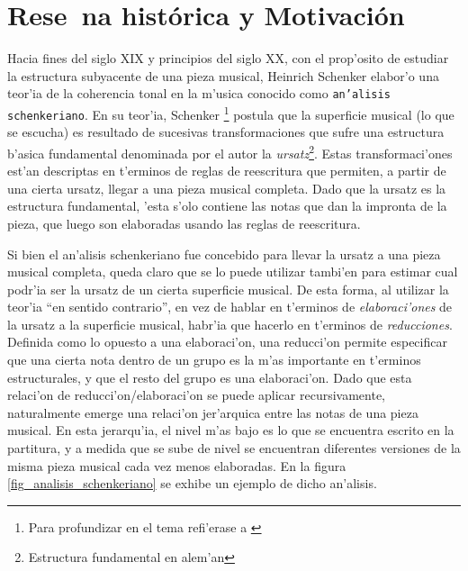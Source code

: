 \section{Rese~na hist\'orica y Motivaci\'on}
Hacia fines del siglo XIX y principios del siglo XX, con el prop'osito de estudiar la estructura subyacente de una pieza musical, 
Heinrich Schenker elabor'o una teor'ia de la coherencia tonal en la m'usica conocido como \texttt{an'alisis schenkeriano}.
En su teor'ia, Schenker \footnote{Para profundizar en el tema refi'erase a \cite{forte03}} postula que la superficie musical (lo que se escucha) es resultado de sucesivas transformaciones que sufre una estructura b'asica fundamental 
denominada por el autor la \emph{ursatz}\footnote{Estructura fundamental en alem'an}. Estas transformaci'ones est'an descriptas en t'erminos de reglas de reescritura que permiten, 
a partir de una cierta ursatz, llegar a una pieza musical completa. Dado que la ursatz es la estructura fundamental, 'esta s'olo contiene las notas que dan la impronta de la pieza, 
que luego son elaboradas usando las reglas de reescritura.

Si bien el an'alisis schenkeriano fue concebido para llevar la ursatz a una pieza musical completa, queda claro que se lo puede utilizar tambi'en para estimar
cual podr'ia ser la ursatz de un cierta superficie musical. De esta forma, al utilizar la teor'ia ``en sentido contrario'', en vez de hablar en t'erminos de \emph{elaboraci'ones} de 
la ursatz a la superficie musical, habr'ia que hacerlo en t'erminos de \emph{reducciones}. Definida como lo opuesto a una elaboraci'on, una reducci'on permite especificar que una cierta 
nota dentro de un grupo es la m'as importante en t'erminos estructurales, y que el resto del grupo es una elaboraci'on. 
Dado que esta relaci'on de reducci'on/elaboraci'on se puede aplicar recursivamente, naturalmente emerge una relaci'on 
jer'arquica entre las notas de una pieza musical.  En esta jerarqu'ia, el nivel m'as bajo es lo que se encuentra escrito en la partitura, y a medida que se sube de nivel se 
encuentran diferentes versiones de la misma pieza musical cada vez menos elaboradas. En la figura \ref{fig_analisis_schenkeriano} se exhibe un ejemplo de dicho an'alisis.


\begin{imagen}
\end{imagen}


